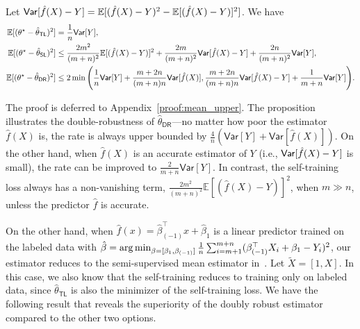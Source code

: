 \begin{proposition}\label{prop:mean_upper}
Let $\mathsf{Var}[{\hat f(X)-Y}] = \mathbb{E}[(\hat f(X)-Y)^2 - \mathbb{E}[(\hat f(X)-Y)]^2]$. We have
   \begin{align*}
    \mathbb{E}[(\theta^\star -  \hat \theta_{\mathsf{TL}})^2] & =  \frac{1}{n} \mathsf{Var}[Y], \\
      \mathbb{E}[(\theta^\star -  \hat \theta_{\mathsf{SL}})^2] &  \leq \frac{2m^2}{(m+n)^2} \mathbb{E}[(\hat f(X)-Y)]^2 + \frac{2m}{(m+n)^2}\mathsf{Var}[{\hat f(X)-Y}]  + \frac{2n}{(m+n)^2} \mathsf{Var}[Y], \\ 
   \mathbb{E}[(\theta^\star -  \hat \theta_{\mathsf{DR}})^2]  & \leq  2\min\Bigg(\frac{1}{n} \mathsf{Var}[Y]+ \frac{m+2n}{(m+n)n } \mathsf{Var}[\hat f(X)], \frac{m+2n}{(m+n)n }\mathsf{Var}[{\hat f(X)-Y}]  + \frac{1}{m+n} \mathsf{Var}[Y]\Bigg).
\end{align*} 
 \end{proposition}
The proof is deferred to Appendix~\ref{proof:mean_upper}. The proposition illustrates the double-robustness of $\hat \theta_{\mathsf{DR}}$---no matter how poor the estimator $\hat f(X)$ is, the rate is always upper bounded by $\frac{4}{n} (\mathsf{Var}[Y]+ \mathsf{Var}[\hat f(X)])$. On the other hand, when $\hat f(X)$ is an accurate estimator of $Y$ (i.e., $\mathsf{Var}[{\hat f(X)-Y}]$ is small), the rate can be improved to $ \frac{2}{m+n} \mathsf{Var}[Y]$. In contrast, the self-training loss always has a non-vanishing term, $\frac{2m^2}{(m+n)^2} \mathbb{E}[(\hat f(X)-Y)]^2$, when $m\gg n$, unless the predictor $\hat f$ is accurate. 

On the other hand, when $\hat f(x) = \hat \beta_{(-1)}^\top x + \hat\beta_{1}$ is a linear predictor trained on the labeled data with $\hat \beta = \operatorname*{arg\,min}_{\beta=[\beta_1, \beta_{(-1)}]} \frac{1}{n}    \sum_{i=m+1}^{m+n} (\beta_{(-1)}^\top X_i +  \beta_{1}- Y_i)^2$, our estimator reduces to the semi-supervised mean estimator in~\citet{zhang2019semi}. Let $\tilde X = [1, X]$. In this case, we also know that the self-training reduces to training only on labeled data, since $\hat\theta_{\mathsf{TL}}$ is also the minimizer of the self-training loss. We have the following result  that reveals the superiority of the doubly robust estimator compared to the other two options. 

